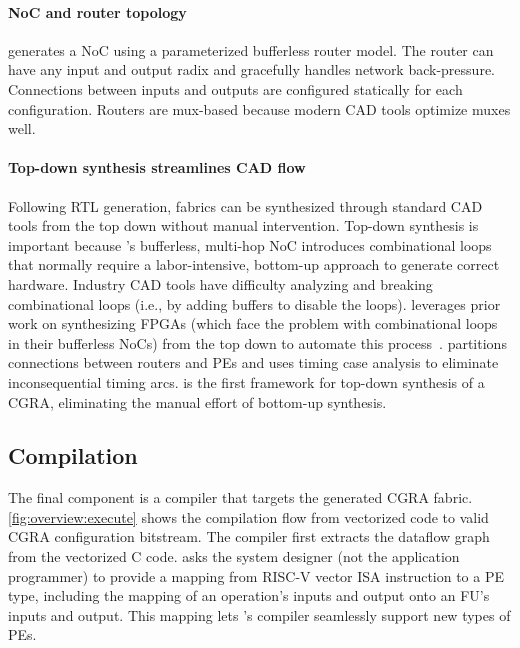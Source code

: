\paragraph{NoC and router topology}
%
\snafuframe generates a NoC using a parameterized bufferless router model.
% 
The router can have any input and output radix and gracefully handles network back-pressure.
%
Connections between inputs and outputs are configured statically for each configuration.
% 
Routers are mux-based because modern CAD tools optimize muxes well.


\paragraph{Top-down synthesis streamlines CAD flow}
\label{snafu:flexible:topdown}
Following RTL generation, \snafuframe fabrics
can be synthesized through standard CAD tools from the top down without manual intervention.
% 
Top-down synthesis is important because \snafu's bufferless, multi-hop
NoC introduces combinational loops that normally require a
labor-intensive, bottom-up approach to generate correct hardware.
% 
Industry CAD tools have difficulty analyzing and breaking combinational loops
(i.e., by adding buffers to disable the loops).
% 
\snafuframe leverages prior work on synthesizing FPGAs (which face the
problem with combinational loops in their bufferless NoCs) from the top down to
automate this process~\cite{li2020automated,top_down}.
% 
\snafuframe partitions connections between routers and PEs and uses timing case analysis to eliminate inconsequential timing arcs.
% 
\snafuframe is the first framework for top-down
synthesis of a CGRA, eliminating the manual effort of bottom-up synthesis.

\subsection{Compilation}

The final component is a compiler that targets the generated CGRA fabric.
% 
\autoref{fig:overview:execute} shows the compilation flow from vectorized code to valid CGRA configuration bitstream.
%
The compiler first extracts the dataflow graph from the vectorized C code.
%
\snafuframe asks the system designer (not the application programmer) to
provide a mapping from \mbox{RISC-V} vector ISA instruction to a PE type, including the
mapping of an operation's inputs and output onto an FU's inputs and
output.
% 
This mapping lets \snafu's compiler seamlessly support new types of PEs.


